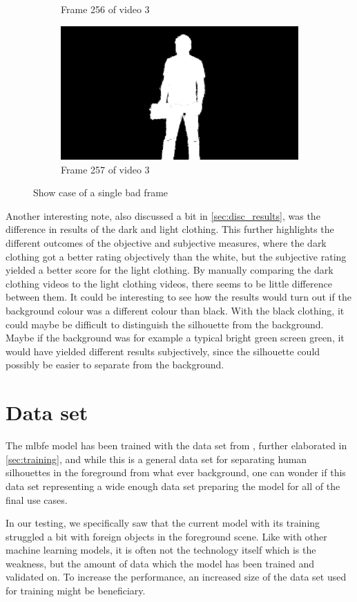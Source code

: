\begin{figure}
\begin{subfigure}{.3\textwidth}
  \caption{Frame 256 of video 3}
  \label{fig:256}
\end{subfigure}%
\begin{subfigure}{.3\textwidth}
  \centering
  \includegraphics[width=\linewidth]{img/256/FG_Showing-Object_BG_White-Wall_fg_257.jpg}
  \caption{Frame 257 of video 3}
  \label{fig:257}
\end{subfigure}
\caption{Show case of a single bad frame}
\label{fig:single_bad_frame}
\end{figure}

Another interesting note, also discussed a bit in \autoref{sec:disc_results}, was the difference in results of the dark and light clothing. This further highlights the different outcomes of the objective and subjective measures, where the dark clothing got a better rating objectively than the white, but the subjective rating yielded a better score for the light clothing. By manually comparing the dark clothing videos to the light clothing videos, there seems to be little difference between them. It could be interesting to see how the results would turn out if the background colour was a different colour than black. With the black clothing, it could maybe be difficult to distinguish the silhouette from the background. Maybe if the background was for example a typical bright green screen green, it would have yielded different results subjectively, since the silhouette could possibly be easier to separate from the background. 

\section{Data set}\label{sec:disc_data}
The \acrlong{mlbfe} model has been trained with the data set from \cite{gmnu21}, further elaborated in \autoref{sec:training}, and while this is a general data set for separating human silhouettes in the foreground from what ever background, one can wonder if this data set representing a wide enough data set preparing the model for all of the final use cases. 

In our testing, we specifically saw that the current model with its training struggled a bit with foreign objects in the foreground scene. Like with other machine learning models, it is often not the technology itself which is the weakness, but the amount of data which the model has been trained and validated on. To increase the performance, an increased size of the data set used for training might be beneficiary. 
